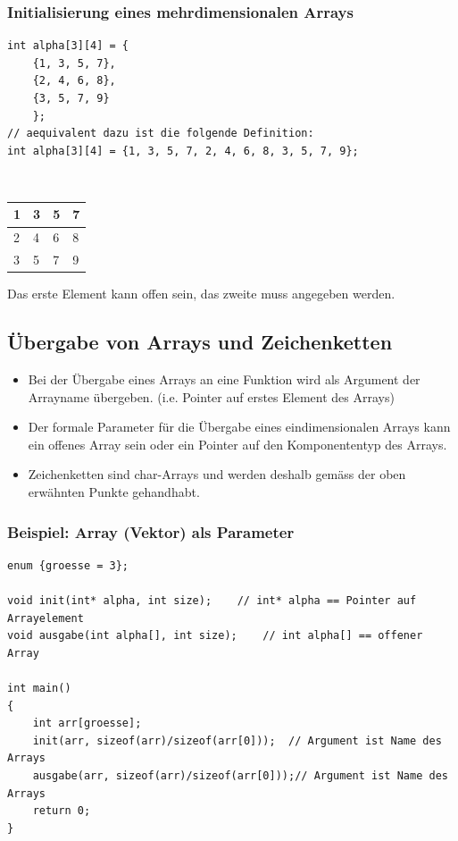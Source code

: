 \subsubsection{Initialisierung eines mehrdimensionalen Arrays}
\label{sec:Initialisierung eines mehrdimensionalen Arrays}
\noindent
\begin{minipage}{\linewidth}
\begin{lstlisting}
int alpha[3][4] = {
	{1, 3, 5, 7},
	{2, 4, 6, 8},
	{3, 5, 7, 9}
	};
// aequivalent dazu ist die folgende Definition:
int alpha[3][4] = {1, 3, 5, 7, 2, 4, 6, 8, 3, 5, 7, 9};
\end{lstlisting}
\end{minipage}
\\
\centering
\begin{tabularx}{0.25\textwidth}{|X|X|X|X|}
	\hline
	1 & 3 & 5 & 7\\
	\hline
	2 & 4 & 6 & 8\\
	\hline
	3 & 5 & 7 & 9\\
	\hline
\end{tabularx}
\flushleft
\begin{hinweis}
	Das erste Element kann offen sein, das zweite muss angegeben werden.
\end{hinweis}



\subsection{Übergabe von Arrays und Zeichenketten}
\label{sec:Uebergabe von Arrays und Zeichenketten}
\begin{itemize}
	\item Bei der Übergabe eines Arrays an eine Funktion wird als Argument der Arrayname übergeben. (i.e. Pointer auf erstes Element des Arrays)
	\item Der formale Parameter für die Übergabe eines eindimensionalen Arrays kann ein offenes Array sein oder ein Pointer auf den Komponententyp des Arrays.
	\item Zeichenketten sind char-Arrays und werden deshalb gemäss der oben erwähnten Punkte gehandhabt.
\end{itemize}

\subsubsection{Beispiel: Array (Vektor) als Parameter}
\label{sec:Beispiel: Array (Vektor) als Parameter}
\noindent
\begin{minipage}{\linewidth}
\begin{lstlisting}
enum {groesse = 3};

void init(int* alpha, int size);	// int* alpha == Pointer auf Arrayelement
void ausgabe(int alpha[], int size);	// int alpha[] == offener Array

int main()
{
	int arr[groesse];
	init(arr, sizeof(arr)/sizeof(arr[0]));	// Argument ist Name des Arrays
	ausgabe(arr, sizeof(arr)/sizeof(arr[0]));// Argument ist Name des Arrays
	return 0;
}
\end{lstlisting}
\end{minipage}

